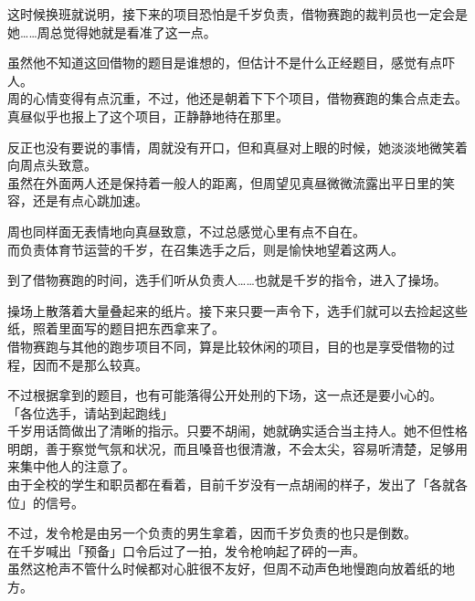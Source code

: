 这时候换班就说明，接下来的项目恐怕是千岁负责，借物赛跑的裁判员也一定会是她……周总觉得她就是看准了这一点。

虽然他不知道这回借物的题目是谁想的，但估计不是什么正经题目，感觉有点吓人。\\

周的心情变得有点沉重，不过，他还是朝着下下个项目，借物赛跑的集合点走去。真昼似乎也报上了这个项目，正静静地待在那里。

反正也没有要说的事情，周就没有开口，但和真昼对上眼的时候，她淡淡地微笑着向周点头致意。\\

虽然在外面两人还是保持着一般人的距离，但周望见真昼微微流露出平日里的笑容，还是有点心跳加速。

周也同样面无表情地向真昼致意，不过总感觉心里有点不自在。\\

而负责体育节运营的千岁，在召集选手之后，则是愉快地望着这两人。\\

\vspace{2\baselineskip}

到了借物赛跑的时间，选手们听从负责人……也就是千岁的指令，进入了操场。

操场上散落着大量叠起来的纸片。接下来只要一声令下，选手们就可以去捡起这些纸，照着里面写的题目把东西拿来了。\\

借物赛跑与其他的跑步项目不同，算是比较休闲的项目，目的也是享受借物的过程，因而不是那么较真。

不过根据拿到的题目，也有可能落得公开处刑的下场，这一点还是要小心的。\\

「各位选手，请站到起跑线」\\

千岁用话筒做出了清晰的指示。只要不胡闹，她就确实适合当主持人。她不但性格明朗，善于察觉气氛和状况，而且嗓音也很清澈，不会太尖，容易听清楚，足够用来集中他人的注意了。\\

由于全校的学生和职员都在看着，目前千岁没有一点胡闹的样子，发出了「各就各位」的信号。

不过，发令枪是由另一个负责的男生拿着，因而千岁负责的也只是倒数。\\

在千岁喊出「预备」口令后过了一拍，发令枪响起了砰的一声。\\

虽然这枪声不管什么时候都对心脏很不友好，但周不动声色地慢跑向放着纸的地方。

